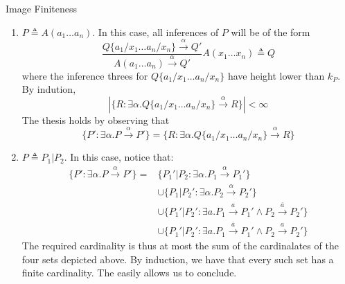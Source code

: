 \begin{Thm}{Image Finiteness}{}
\begin{demonstration}
\begin{itemize}
\begin{enumerate}
            Since $k_Q < k_P$, we can use the induction hypothesis and obtain that
            \begin{equation*}
                |\{Q':\exists\alpha.Q\xrightarrow{\alpha}Q'\}|<\infty
            \end{equation*}
            the thesis holds by observing that 
            \begin{equation*}
                \{P':\exists\alpha.P\xrightarrow{\alpha}P'\}\subseteq\{Q'\backslash a:\exists\alpha.Q\xrightarrow{\alpha}Q'\}
            \end{equation*}
            \item $P\triangleq A(a_1\ldots a_n)$. In this case, all inferences of $P$ will be of the form
            \begin{equation*}
                \frac{Q\{a_1/x_1\ldots a_n/x_n\}\xrightarrow{\alpha}Q'}{A(a_1\ldots a_n)\xrightarrow{\alpha}Q'}A(x_1\ldots x_n)\triangleq Q
            \end{equation*}
            where the inference threes for $Q\{a_1/x_1\ldots a_n/x_n\}$ have height lower than $k_P$. By indution,
            \begin{equation*}
                |\{R:\exists\alpha.Q\{a_1/x_1\ldots a_n/x_n\}\xrightarrow{\alpha}R\}|<\infty
            \end{equation*}
            The thesis holds by observing that
            \begin{equation*}
                \{P':\exists\alpha.P\xrightarrow{\alpha}P'\}=\{R:\exists\alpha.Q\{a_1/x_1\ldots a_n/x_n\}\xrightarrow{\alpha}R\}
            \end{equation*}
            \item $P\triangleq P_1|P_2$. In this case, notice that:
            \begin{align*}
                \{P':\exists\alpha.P\xrightarrow{\alpha}P'\} = 
                &\{P_1'|P_2:\exists\alpha.P_1\xrightarrow{\alpha}P_1'\}\\
                &\cup\{P_1|P_2':\exists\alpha.P_2\xrightarrow{\alpha}P_2'\}\\
                &\cup\{P_1'|P_2':\exists a.P_1\xrightarrow{a}P_1'\land P_2\xrightarrow{\overline{a}}P_2'\}\\
                &\cup\{P_1'|P_2':\exists a.P_1\xrightarrow{\overline{a}}P_1'\land P_2\xrightarrow{a}P_2'\}
            \end{align*}
            The required cardinality is thus at most the sum of the cardinalates of the four sets depicted above. By induction, we have that every such set has a finite cardinality. The easily allows us to conclude.
        \end{enumerate}
    \end{itemize}
\end{demonstration}
\end{Thm}

